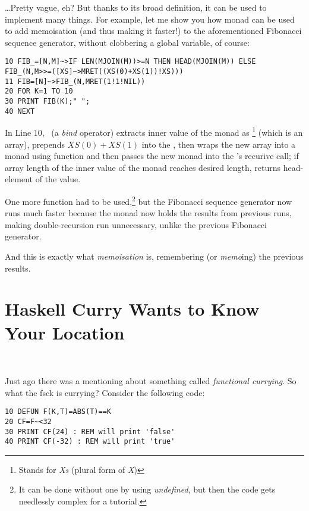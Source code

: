 \ldots Pretty vague, eh? But thanks to its broad definition, it can be used to implement many things. For example, let me show you how monad can be used to add memoisation (and thus making it faster!) to the aforementioned Fibonacci sequence generator, without clobbering a global variable, of course:

\begin{lstlisting}
10 FIB_=[N,M]~>IF LEN(MJOIN(M))>=N THEN HEAD(MJOIN(M)) ELSE FIB_(N,M>>=([XS]~>MRET((XS(0)+XS(1))!XS)))
11 FIB=[N]~>FIB_(N,MRET(1!1!NIL))
20 FOR K=1 TO 10
30 PRINT FIB(K);" ";
40 NEXT
\end{lstlisting}

In Line 10, \basicmbind\ (a \emph{bind} operator) extracts inner value of the monad  as \footnote{Stands for \emph{Xs} (plural form of \emph{X})} (which is an array), prepends $XS(0) + XS(1)$ into the , then wraps the new array into a monad using  function and then passes the new monad into the 's recurive call; if array length of the inner value of the monad reaches desired length, returns head-element of the value.

One more function  had to be used,\footnote{It can be done without one by using \emph{undefined}, but then the code gets needlessly complex for a tutorial.} but the Fibonacci sequence generator now runs much faster because the monad now holds the results from previous runs, making double-recursion run unnecessary, unlike the previous Fibonacci generator.

And this is exactly what \emph{memoisation} is, remembering (or \emph{memo}ing) the previous results.

\section[Currying]{Haskell Curry Wants to Know Your Location}
\label{currying101}

\vspace*{-\mytextsize}\ \par %
Just \setcounter{curryingselfref}{\value{page} - \value{curryingappearance}} ago there was a mentioning about something called \emph{functional currying}. So what the fsck is currying? Consider the following code:

\begin{lstlisting}
10 DEFUN F(K,T)=ABS(T)==K
20 CF=F~<32
30 PRINT CF(24) : REM will print 'false'
40 PRINT CF(-32) : REM will print 'true'
\end{lstlisting}

